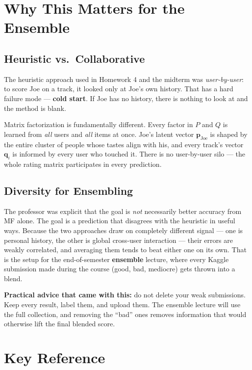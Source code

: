 \documentclass[11pt]{article}
\begin{document}
\section{Why This Matters for the Ensemble}

\subsection{Heuristic vs.\ Collaborative}
The heuristic approach used in Homework 4 and the midterm was \emph{user-by-user}: to score Joe on a track, it looked only at Joe's own history. That has a hard failure mode --- \textbf{cold start}. If Joe has no history, there is nothing to look at and the method is blank.

Matrix factorization is fundamentally different. Every factor in $P$ and $Q$ is learned from \emph{all} users and \emph{all} items at once. Joe's latent vector $\mathbf{p}_{\text{Joe}}$ is shaped by the entire cluster of people whose tastes align with his, and every track's vector $\mathbf{q}_i$ is informed by every user who touched it. There is no user-by-user silo --- the whole rating matrix participates in every prediction.

\subsection{Diversity for Ensembling}
The professor was explicit that the goal is \emph{not} necessarily better accuracy from MF alone. The goal is a prediction that disagrees with the heuristic in useful ways. Because the two approaches draw on completely different signal --- one is personal history, the other is global cross-user interaction --- their errors are weakly correlated, and averaging them tends to beat either one on its own. That is the setup for the end-of-semester \textbf{ensemble} lecture, where every Kaggle submission made during the course (good, bad, mediocre) gets thrown into a blend.

\textbf{Practical advice that came with this:} do not delete your weak submissions. Keep every result, label them, and upload them. The ensemble lecture will use the full collection, and removing the ``bad'' ones removes information that would otherwise lift the final blended score.


\section{Key Reference}
\end{document}
